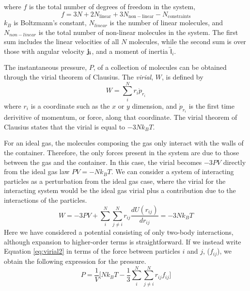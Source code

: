 where $f$ is the total number of degrees of freedom in the system,
\begin{equation}
f = 3 N + 2 N_{\mathrm{linear}} + 3 N_{\mathrm{non-linear}} - N_{\mathrm{constraints}}
\end{equation}
$k_B$ is Boltzmann's constant, $N_{linear}$ is the number of linear
molecules, and $N_{non-linear}$ is the total number of non-linear
molecules in the system. The first sum includes the linear velocities
of all $N$ molecules, while the second sum is over those with angular
velocity $\bf j_i$, and a moment of inertia
$\overleftrightarrow{\mathsf{I}}_i$.

The instantaneous pressure, $P$, of a collection of molecules can be
obtained through the virial theorem of Clausius. The \textit{virial},
$W$, is defined by
\begin{equation}\label{eq:virial}
W = \sum_i^N r_i\dot{p}_{r_i}
\end{equation}
where $r_i$ is a coordinate such as the $x$ or $y$ dimension, and
$\dot{p}_{r_i}$ is the first time derivitive of momentum, or force,
along that coordinate. The virial theorem of Clausius states that the
virial is equal to $-3Nk_BT$.

For an ideal gas, the molecules composing the gas only interact with
the walls of the container. Therefore, the only forces present in the
system are due to those between the gas and the container. In this
case, the virial becomes $-3PV$ directly from the ideal gas law
$PV=-Nk_BT$. We can consider a system of interacting particles as a
perturbation from the ideal gas case, where the virial for the
interacting system would be the ideal gas virial plus a contribution
due to the interactions of the particles. 
\begin{equation}\label{eq:virial2}
W = -3PV + \sum_i^N \sum_{j\neq i}^N r_{ij} \frac{dU(r_{ij})}{dr_{ij}} = -3Nk_BT
\end{equation}
Here we have considered a potential consisting of only two-body
interactions, although expansion to higher-order terms is
straightforward. If we instead write Equation \eqref{eq:virial2} in terms
of the force between particles $i$ and $j$, ($f_{ij}$), we obtain the
following expression for the pressure.
\begin{equation}\label{eq:virial3}
P = \frac{1}{V}\Big[Nk_BT - \frac{1}{3} \sum_i^N \sum_{j\neq i}^N
r_{ij} f_{ij}\Big]
\end{equation}

